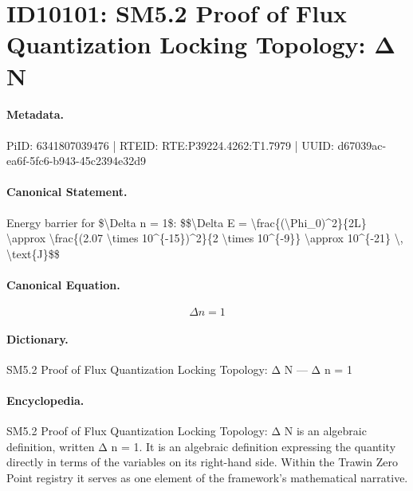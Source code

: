 \section*{ID10101: SM5.2 Proof of Flux Quantization Locking Topology: Δ N}
\paragraph{Metadata.}
PiID: 6341807039476 | RTEID: RTE:P39224.4262:T1.7979 | UUID: d67039ac-ea6f-5fc6-b943-45c2394e32d9

\paragraph{Canonical Statement.}
Energy barrier for \$\textbackslash{}Delta n = 1\$: \$\$\textbackslash{}Delta E = \textbackslash{}frac\{(\textbackslash{}Phi\_0)\textasciicircum{}2\}\{2L\} \textbackslash{}approx \textbackslash{}frac\{(2.07 \textbackslash{}times 10\textasciicircum{}\{-15\})\textasciicircum{}2\}\{2 \textbackslash{}times 10\textasciicircum{}\{-9\}\} \textbackslash{}approx 10\textasciicircum{}\{-21\} \textbackslash{}, \textbackslash{}text\{J\}\$\$

\paragraph{Canonical Equation.}
\[
\Delta n = 1
\]

\paragraph{Dictionary.}
SM5.2 Proof of Flux Quantization Locking Topology: Δ N — Δ n = 1

\paragraph{Encyclopedia.}
SM5.2 Proof of Flux Quantization Locking Topology: Δ N is an algebraic definition, written Δ n = 1. It is an algebraic definition expressing the quantity directly in terms of the variables on its right-hand side. Within the Trawin Zero Point registry it serves as one element of the framework's mathematical narrative.
